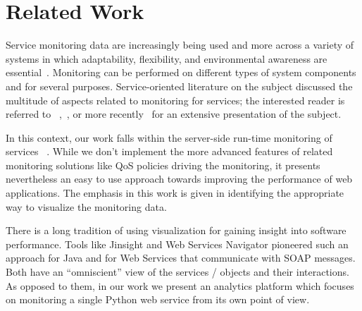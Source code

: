 
\section{Related Work}
\label{sec:related}

Service monitoring data are increasingly being used and more across a variety of systems in which adaptability, flexibility, and environmental awareness are essential~\cite{pernici2016monitoring}. Monitoring can be performed on different types of system components and for several purposes. Service-oriented literature on the subject discussed the multitude of aspects related to monitoring for services; the interested reader is referred to ~\cite{ghezzi2007run},~\cite{metzger2010analytical}, or more recently~\cite{pernici2016monitoring} for an extensive presentation of the subject. 

In this context, our work falls within the server-side run-time monitoring of services ~\cite{ghezzi2007run}. While we don't implement the more advanced features of related monitoring solutions like QoS policies driving the monitoring, it presents nevertheless an easy to use approach towards improving the performance of web applications. The emphasis in this work is given in identifying the appropriate way to visualize the monitoring data.
  
There is a long tradition of using visualization for gaining insight into software performance. Tools like Jinsight \cite{Pauw02a} and Web Services Navigator \cite{Pauw05} pioneered such an approach for Java and for Web Services that communicate with SOAP messages. Both have an ``omniscient'' view of the services / objects and their interactions. As opposed to them, in our work we present an analytics platform which focuses on monitoring a single Python web service from its own point of view.



